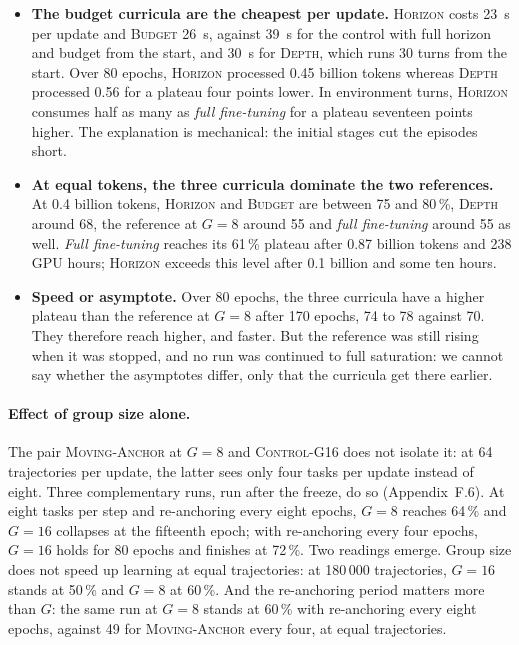 \documentclass[11pt,a4paper]{article}
\begin{document}
\begin{itemize}
    \item \textbf{The budget curricula are the cheapest per update.} \textsc{Horizon} costs 23~s per update and \textsc{Budget} 26~s, against 39~s for the control with full horizon and budget from the start, and 30~s for \textsc{Depth}, which runs 30 turns from the start. Over 80 epochs, \textsc{Horizon} processed 0.45 billion tokens whereas \textsc{Depth} processed 0.56 for a plateau four points lower. In environment turns, \textsc{Horizon} consumes half as many as \emph{full fine-tuning} for a plateau seventeen points higher. The explanation is mechanical: the initial stages cut the episodes short.
    \item \textbf{At equal tokens, the three curricula dominate the two references.} At 0.4 billion tokens, \textsc{Horizon} and \textsc{Budget} are between 75 and 80\,\%, \textsc{Depth} around 68, the reference at $G=8$ around 55 and \emph{full fine-tuning} around 55 as well. \emph{Full fine-tuning} reaches its 61\,\% plateau after 0.87 billion tokens and 238 GPU hours; \textsc{Horizon} exceeds this level after 0.1 billion and some ten hours.
    \item \textbf{Speed or asymptote.} Over 80 epochs, the three curricula have a higher plateau than the reference at $G=8$ after 170 epochs, 74 to 78 against 70. They therefore reach higher, and faster. But the reference was still rising when it was stopped, and no run was continued to full saturation: we cannot say whether the asymptotes differ, only that the curricula get there earlier.
\end{itemize}

\paragraph{Effect of group size alone.} The pair \textsc{Moving-Anchor} at $G=8$ and \textsc{Control-G16} does not isolate it: at 64 trajectories per update, the latter sees only four tasks per update instead of eight. Three complementary runs, run after the freeze, do so (Appendix~F.6). At eight tasks per step and re-anchoring every eight epochs, $G=8$ reaches 64\,\% and $G=16$ collapses at the fifteenth epoch; with re-anchoring every four epochs, $G=16$ holds for 80 epochs and finishes at 72\,\%. Two readings emerge. Group size does not speed up learning at equal trajectories: at 180\,000 trajectories, $G=16$ stands at 50\,\% and $G=8$ at 60\,\%. And the re-anchoring period matters more than $G$: the same run at $G=8$ stands at 60\,\% with re-anchoring every eight epochs, against 49 for \textsc{Moving-Anchor} every four, at equal trajectories.
\end{document}
